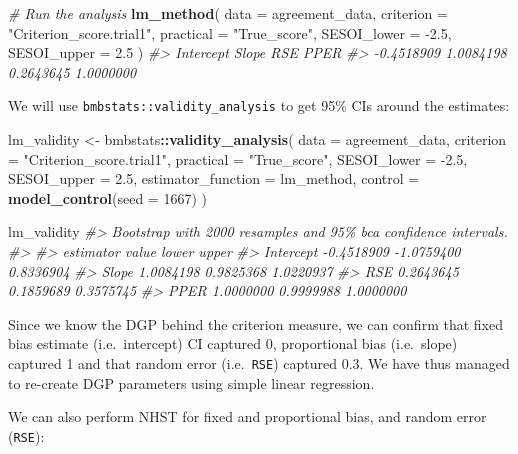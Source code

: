 \documentclass[
]{book}
\newenvironment{Shaded}{\begin{snugshade}}{\end{snugshade}}
\newcommand{\CommentTok}[1]{\textcolor[rgb]{0.56,0.35,0.01}{\textit{#1}}}
\newcommand{\DataTypeTok}[1]{\textcolor[rgb]{0.13,0.29,0.53}{#1}}
\newcommand{\DecValTok}[1]{\textcolor[rgb]{0.00,0.00,0.81}{#1}}
\newcommand{\FloatTok}[1]{\textcolor[rgb]{0.00,0.00,0.81}{#1}}
\newcommand{\KeywordTok}[1]{\textcolor[rgb]{0.13,0.29,0.53}{\textbf{#1}}}
\newcommand{\NormalTok}[1]{#1}
\newcommand{\OperatorTok}[1]{\textcolor[rgb]{0.81,0.36,0.00}{\textbf{#1}}}
\newcommand{\StringTok}[1]{\textcolor[rgb]{0.31,0.60,0.02}{#1}}
\begin{document}
\begin{Shaded}
\begin{Highlighting}[]
\CommentTok{\# Run the analysis}
\KeywordTok{lm\_method}\NormalTok{(}
  \DataTypeTok{data =}\NormalTok{ agreement\_data,}
  \DataTypeTok{criterion =} \StringTok{"Criterion\_score.trial1"}\NormalTok{,}
  \DataTypeTok{practical =} \StringTok{"True\_score"}\NormalTok{,}
  \DataTypeTok{SESOI\_lower =} \FloatTok{{-}2.5}\NormalTok{,}
  \DataTypeTok{SESOI\_upper =} \FloatTok{2.5}
\NormalTok{)}
\CommentTok{\#>  Intercept      Slope        RSE       PPER }
\CommentTok{\#> {-}0.4518909  1.0084198  0.2643645  1.0000000}
\end{Highlighting}
\end{Shaded}

We will use \texttt{bmbstats::validity\_analysis} to get 95\% CIs around the estimates:

\begin{Shaded}
\begin{Highlighting}[]
\NormalTok{lm\_validity <{-}}\StringTok{ }\NormalTok{bmbstats}\OperatorTok{::}\KeywordTok{validity\_analysis}\NormalTok{(}
  \DataTypeTok{data =}\NormalTok{ agreement\_data,}
  \DataTypeTok{criterion =} \StringTok{"Criterion\_score.trial1"}\NormalTok{,}
  \DataTypeTok{practical =} \StringTok{"True\_score"}\NormalTok{,}
  \DataTypeTok{SESOI\_lower =} \FloatTok{{-}2.5}\NormalTok{,}
  \DataTypeTok{SESOI\_upper =} \FloatTok{2.5}\NormalTok{,}
  \DataTypeTok{estimator\_function =}\NormalTok{ lm\_method,}
  \DataTypeTok{control =} \KeywordTok{model\_control}\NormalTok{(}\DataTypeTok{seed =} \DecValTok{1667}\NormalTok{)}
\NormalTok{)}

\NormalTok{lm\_validity}
\CommentTok{\#> Bootstrap with 2000 resamples and 95\% bca confidence intervals.}
\CommentTok{\#> }
\CommentTok{\#>  estimator      value      lower     upper}
\CommentTok{\#>  Intercept {-}0.4518909 {-}1.0759400 0.8336904}
\CommentTok{\#>      Slope  1.0084198  0.9825368 1.0220937}
\CommentTok{\#>        RSE  0.2643645  0.1859689 0.3575745}
\CommentTok{\#>       PPER  1.0000000  0.9999988 1.0000000}
\end{Highlighting}
\end{Shaded}

Since we know the DGP behind the criterion measure, we can confirm that fixed bias estimate (i.e.~intercept) CI captured 0, proportional bias (i.e.~slope) captured 1 and that random error (i.e.~\texttt{RSE}) captured 0.3. We have thus managed to re-create DGP parameters using simple linear regression.

We can also perform NHST for fixed and proportional bias, and random error (\texttt{RSE}):
\end{document}
